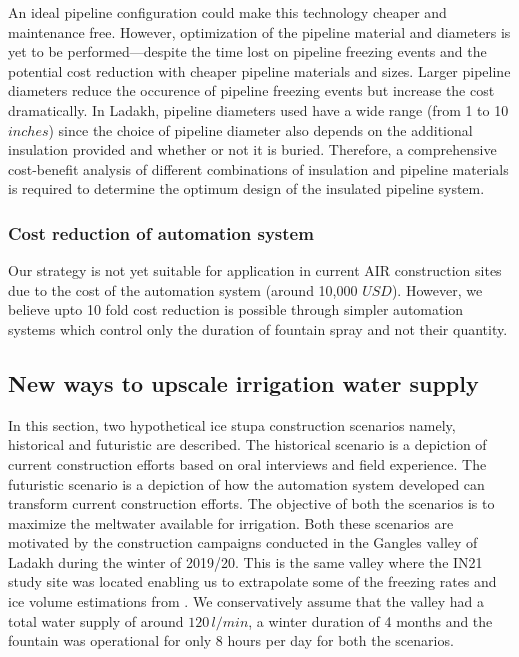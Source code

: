 \documentclass[tc, manuscript]{copernicus}
\begin{document}
An ideal pipeline configuration could make this technology cheaper and maintenance free. However, optimization
of the pipeline material and diameters is yet to be performed---despite the time lost on pipeline freezing
events and the potential cost reduction with cheaper pipeline materials and sizes. Larger pipeline diameters
reduce the occurence of pipeline freezing events but increase the cost dramatically. In Ladakh, pipeline
diameters used have a wide range (from 1 to 10 $inches$) since the choice of pipeline diameter also depends on
the additional insulation provided and whether or not it is buried. Therefore, a comprehensive cost-benefit
analysis of different combinations of insulation and pipeline materials is required to determine the optimum
design of the insulated pipeline system.  

\subsubsection{Cost reduction of automation system}

Our strategy is not yet suitable for application in current AIR construction sites due to the cost of the
automation system (around 10,000 $USD$). However, we believe upto 10 fold cost reduction is possible through
simpler automation systems which control only the duration of fountain spray and not their quantity. 

\subsection{New ways to upscale irrigation water supply}

In this section, two hypothetical ice stupa construction scenarios namely, historical and futuristic are
described. The historical scenario is a depiction of current construction efforts based on oral interviews and
field experience. The futuristic scenario is a depiction of how the automation system developed can transform
current construction efforts. The objective of both the scenarios is to maximize the meltwater available for
irrigation. Both these scenarios are motivated by the construction campaigns conducted in the Gangles valley of
Ladakh during the winter of 2019/20. This is the same valley where the IN21 study site was located enabling us
to extrapolate some of the freezing rates and ice volume estimations from
\citet{balasubramanianInfluenceMeteorologicalConditions2022}. We conservatively assume that the valley had a
total water supply of around $120\,l/min$, a winter duration of 4 months and the fountain was operational for
only 8 hours per day for both the scenarios. 
\end{document}
